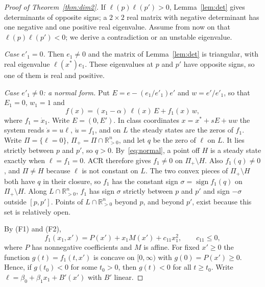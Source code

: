 \documentclass[11pt]{amsart}
\theoremstyle{definition}
\theoremstyle{remark}
\newcommand{\Rpos}{\mathbb R_{>0}}
\begin{document}
\begin{proof}[Proof of Theorem~\ref{thm:dim2}]
If $\ell(p)\ell(p')>0$, Lemma~\ref{lem:det} gives determinants of opposite signs; a $2\times2$ real matrix with negative determinant has one negative and one positive real eigenvalue. Assume from now on that $\ell(p)\ell(p')<0$; we derive a contradiction or an unstable eigenvalue.

\emph{Case $e'_1=0$.} Then $e_1\ne0$ and the matrix of Lemma~\ref{lem:det} is triangular, with real eigenvalue $\ell(x^*)e_1$. These eigenvalues at $p$ and $p'$ have opposite signs, so one of them is real and positive.

\emph{Case $e'_1\neq0$: a normal form.} Put $E=e-(e_1/e'_1)e'$ and $w=e'/e'_1$, so that $E_1=0$, $w_1=1$ and
\begin{equation}\label{eq:normal}
 f(x)=(x_1-\alpha)\,\ell(x)\,E+f_1(x)\,w ,
\end{equation}
where $f_1=\dot x_1$. Write $E=(0,E')$. In class coordinates $x=x^*+sE+uw$ the system reads $\dot s=u\ell$, $\dot u=f_1$, and on $L$ the steady states are the zeros of $f_1$. Write $\Pi=\{\ell=0\}$, $\Pi_+=\Pi\cap\Rpos^n$, and let $q$ be the zero of $\ell$ on $L$. It lies strictly between $p$ and $p'$, so $q>0$. By~\eqref{eq:normal}, a point off $H$ is a steady state exactly when $\ell=f_1=0$. ACR therefore gives $f_1\neq0$ on $\Pi_+\setminus H$. Also $f_1(q)\ne0$, and $\Pi\neq H$ because $\ell$ is not constant on $L$. The two convex pieces of $\Pi_+\setminus H$ both have $q$ in their closure, so $f_1$ has the constant sign $\sigma=\operatorname{sign}f_1(q)$ on $\Pi_+\setminus H$. Along $L\cap\Rpos^n$, $f_1$ has sign $\sigma$ strictly between $p$ and $p'$ and sign $-\sigma$ outside $[p,p']$. Points of $L\cap\Rpos^n$ beyond $p$, and beyond $p'$, exist because this set is relatively open.

By (F1) and (F2),
\begin{equation}\label{eq:concave}
 f_1(x_1,x')=P(x')+x_1M(x')+c_{11}x_1^2,\qquad c_{11}\le0,
\end{equation}
where $P$ has nonnegative coefficients and $M$ is affine. For fixed $x'\ge0$ the function $g(t)=f_1(t,x')$ is concave on $[0,\infty)$ with $g(0)=P(x')\ge0$. Hence, if $g(t_0)<0$ for some $t_0>0$, then $g(t)<0$ for all $t\ge t_0$. Write $\ell=\beta_0+\beta_1x_1+B'(x')$ with $B'$ linear.


\end{proof}
\end{document}
